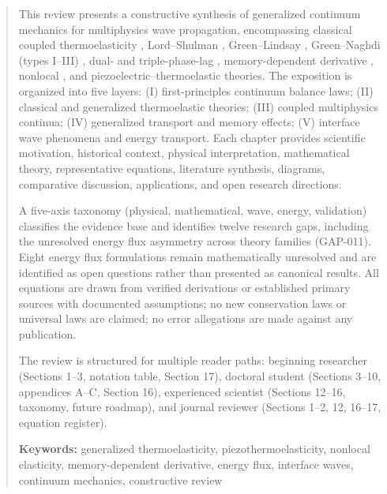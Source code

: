 \begin{abstract}
\noindent
This review presents a constructive synthesis of generalized continuum mechanics for multiphysics wave propagation, encompassing classical coupled thermoelasticity \cite{Biot1956}, Lord--Shulman \cite{Lord1967}, Green--Lindsay \cite{Green1972}, Green--Naghdi (types I--III) \cite{Green1991,Green1993}, dual- and triple-phase-lag \cite{Tzou1995,Tzou1997}, memory-dependent derivative \cite{Wang2011}, nonlocal \cite{Eringen1972}, and piezoelectric--thermoelastic theories. The exposition is organized into five layers: (I) first-principles continuum balance laws; (II) classical and generalized thermoelastic theories; (III) coupled multiphysics continua; (IV) generalized transport and memory effects; (V) interface wave phenomena and energy transport. Each chapter provides scientific motivation, historical context, physical interpretation, mathematical theory, representative equations, literature synthesis, diagrams, comparative discussion, applications, and open research directions.

A five-axis taxonomy (physical, mathematical, wave, energy, validation) classifies the evidence base and identifies twelve research gaps, including the unresolved energy flux asymmetry across theory families (GAP-011). Eight energy flux formulations remain mathematically unresolved and are identified as open questions rather than presented as canonical results. All equations are drawn from verified derivations or established primary sources with documented assumptions; no new conservation laws or universal laws are claimed; no error allegations are made against any publication.

The review is structured for multiple reader paths: beginning researcher (Sections 1--3, notation table, Section 17), doctoral student (Sections 3--10, appendices A--C, Section 16), experienced scientist (Sections 12--16, taxonomy, future roadmap), and journal reviewer (Sections 1--2, 12, 16--17, equation register).

\medskip
\noindent\textbf{Keywords:} generalized thermoelasticity, piezothermoelasticity, nonlocal elasticity, memory-dependent derivative, energy flux, interface waves, continuum mechanics, constructive review
\end{abstract}
